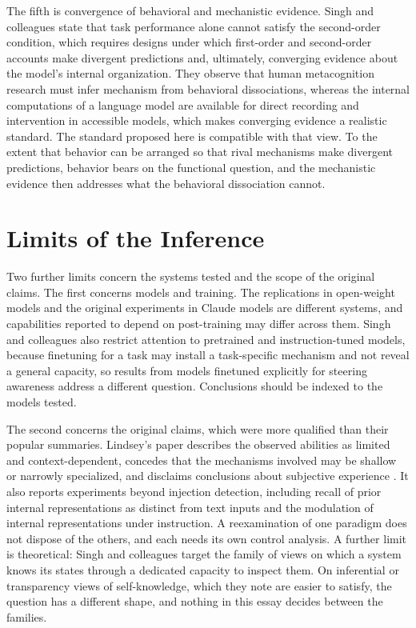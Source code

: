 \documentclass[11pt]{article}
\theoremstyle{definition}
\theoremstyle{remark}
\begin{document}
The fifth is convergence of behavioral and mechanistic evidence. Singh and colleagues state that task performance alone cannot satisfy the second-order condition, which requires designs under which first-order and second-order accounts make divergent predictions and, ultimately, converging evidence about the model's internal organization. They observe that human metacognition research must infer mechanism from behavioral dissociations, whereas the internal computations of a language model are available for direct recording and intervention in accessible models, which makes converging evidence a realistic standard. The standard proposed here is compatible with that view. To the extent that behavior can be arranged so that rival mechanisms make divergent predictions, behavior bears on the functional question, and the mechanistic evidence then addresses what the behavioral dissociation cannot.

\section{Limits of the Inference}

Two further limits concern the systems tested and the scope of the original claims. The first concerns models and training. The replications in open-weight models and the original experiments in Claude models are different systems, and capabilities reported to depend on post-training \citep{macar2026} may differ across them. Singh and colleagues also restrict attention to pretrained and instruction-tuned models, because finetuning for a task may install a task-specific mechanism and not reveal a general capacity, so results from models finetuned explicitly for steering awareness address a different question. Conclusions should be indexed to the models tested.

The second concerns the original claims, which were more qualified than their popular summaries. Lindsey's paper describes the observed abilities as limited and context-dependent, concedes that the mechanisms involved may be shallow or narrowly specialized, and disclaims conclusions about subjective experience \citep{lindsey2025}. It also reports experiments beyond injection detection, including recall of prior internal representations as distinct from text inputs and the modulation of internal representations under instruction. A reexamination of one paradigm does not dispose of the others, and each needs its own control analysis. A further limit is theoretical: Singh and colleagues target the family of views on which a system knows its states through a dedicated capacity to inspect them. On inferential or transparency views of self-knowledge, which they note are easier to satisfy, the question has a different shape, and nothing in this essay decides between the families.
\end{document}
